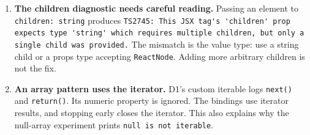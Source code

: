 \begin{enumerate}
  and prefixes the warning text with \passthrough{\lstinline![react warning]!} in the normal output stream.
  This makes the missing-key, special-key and unknown-prop messages visible in \passthrough{\lstinline!output.txt!}
  when \passthrough{\lstinline!npm run all > output.txt!} is used. An ordinary stdout redirect would leave them out.
\item
  \textbf{The children diagnostic needs careful reading.} Passing an element to \passthrough{\lstinline!children: string!}
  produces \passthrough{\lstinline!TS2745: This JSX tag's 'children' prop expects type 'string' which requires multiple children, but only a single child was provided.!}
  The mismatch is the value type: use a string child or a props type accepting \passthrough{\lstinline!ReactNode!}.
  Adding more arbitrary children is not the fix.
\item
  \textbf{An array pattern uses the iterator.} D1's custom iterable logs \passthrough{\lstinline!next()!} and \passthrough{\lstinline!return()!}.
  Its numeric property is ignored. The bindings use iterator results, and stopping early
  closes the iterator. This also explains why the null-array experiment prints \passthrough{\lstinline!null is not iterable!}.
\end{enumerate}

